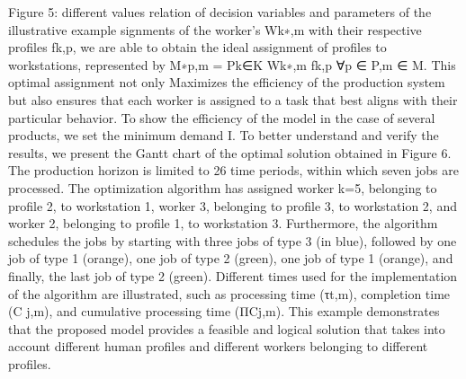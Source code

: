 Figure 5: different values relation of decision variables and parameters of the illustrative example
signments of the worker’s Wk∗,m with their respective profiles fk,p, we are able to obtain the ideal assignment of profiles to workstations, represented by M∗p,m = Pk∈K Wk∗,m fk,p ∀p ∈ P,m ∈ M. This optimal assignment not only Maximizes the efficiency of the production system but also ensures that each worker is assigned to a task that best aligns with their particular behavior. To show the efficiency of the model in the case of several products, we set the minimum demand I. To better understand and verify the results, we present the Gantt chart of the optimal solution obtained in Figure 6. The production horizon is limited to 26 time periods, within which seven jobs are processed. The optimization algorithm has assigned worker k=5, belonging to profile 2, to workstation 1, worker 3, belonging to profile 3, to workstation 2, and worker 2, belonging to profile 1, to workstation 3. Furthermore, the algorithm schedules the jobs by starting with three jobs of type 3 (in blue), followed by one job of type 1 (orange), one job of type 2 (green), one job of type 1 (orange), and finally, the last job of type 2 (green).
Different times used for the implementation of the algorithm are illustrated, such as processing time (τt,m), completion time (C j,m), and cumulative processing time (ΠCj,m). This example demonstrates that the proposed model provides a feasible and logical solution that takes into account different human profiles and different workers belonging to different profiles.
 
